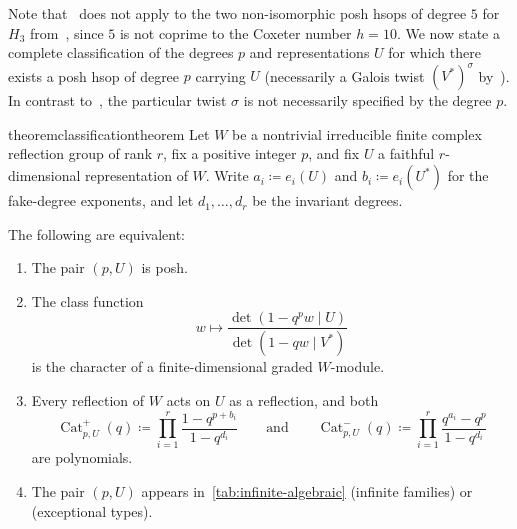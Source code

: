 \documentclass[10pt,a4paper]{amsart}
\newcommand{\defeq}{\coloneqq}
\newcommand{\operatorstyle}{\textstyle}
\DeclareMathOperator{\Cat}{Cat}
\theoremstyle{definition}
\newcommand{\nathan}[1]{\todo[size=\tiny,color=green!30]{#1 \\ \hfill --- N.}}
\begin{document}
Note that~ does not apply to the two non-isomorphic posh hsops of degree $5$ for $H_3$ from~, since $5$ is not coprime to the Coxeter number $h=10$.  We now state a complete classification of the degrees $p$ and representations $U$ for which there exists a posh hsop of degree $p$ carrying $U$ (necessarily a Galois twist $(V^*)^\sigma$ by~).  In contrast to~, the particular twist $\sigma$ is not necessarily specified by the degree $p$.

\begin{restatable}{theorem}{classificationtheorem}\label{c:thm:main}
Let $W$ be a nontrivial irreducible finite complex reflection group of rank $r$,
fix a positive integer $p$, and fix $U$ a faithful $r$-dimensional
representation of $W$. Write $a_i\defeq e_i(U)$ and
$b_i\defeq e_i(U^*)$ for the fake-degree exponents, and let
$d_1,\ldots,d_r$ be the invariant degrees. 

The following are
equivalent:
\begin{enumerate}
\item The pair $(p,U)$ is posh.
\item The class function
\[
 w\longmapsto\frac{\det(1-q^p w\mid U)}{\det(1-qw\mid V^*)}
\]
is the character of a finite-dimensional graded $W$-module.
\item Every reflection of $W$ acts on $U$ as a reflection, and both
\begin{equation*}
 \operatorstyle
 \Cat^+_{p,U}(q)\defeq\prod\limits_{i=1}^r\frac{1-q^{p+b_i}}{1-q^{d_i}}
 \qquad\text{and}\qquad
 \Cat^-_{p,U}(q)\defeq\prod\limits_{i=1}^r
                              \frac{q^{a_i}-q^p}{1-q^{d_i}}
\end{equation*}
are polynomials.
\item The pair $(p,U)$ appears in~\cref{tab:infinite-algebraic} (infinite families) or~ (exceptional types).%
\end{enumerate}
\end{restatable}

\end{document}
